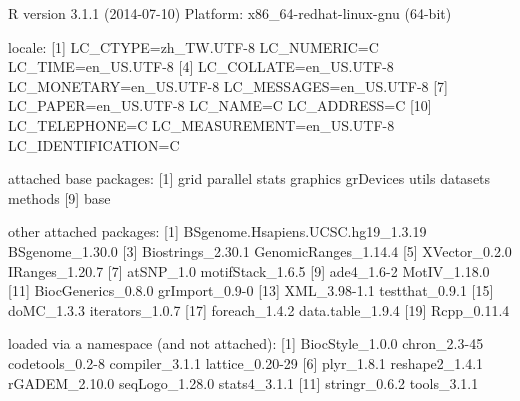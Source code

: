 \documentclass[a4paper,10pt]{article}
\begin{document}
\begin{Schunk}
\begin{Soutput}
R version 3.1.1 (2014-07-10)
Platform: x86_64-redhat-linux-gnu (64-bit)

locale:
 [1] LC_CTYPE=zh_TW.UTF-8       LC_NUMERIC=C               LC_TIME=en_US.UTF-8       
 [4] LC_COLLATE=en_US.UTF-8     LC_MONETARY=en_US.UTF-8    LC_MESSAGES=en_US.UTF-8   
 [7] LC_PAPER=en_US.UTF-8       LC_NAME=C                  LC_ADDRESS=C              
[10] LC_TELEPHONE=C             LC_MEASUREMENT=en_US.UTF-8 LC_IDENTIFICATION=C       

attached base packages:
[1] grid      parallel  stats     graphics  grDevices utils     datasets  methods  
[9] base     

other attached packages:
 [1] BSgenome.Hsapiens.UCSC.hg19_1.3.19 BSgenome_1.30.0                   
 [3] Biostrings_2.30.1                  GenomicRanges_1.14.4              
 [5] XVector_0.2.0                      IRanges_1.20.7                    
 [7] atSNP_1.0                          motifStack_1.6.5                  
 [9] ade4_1.6-2                         MotIV_1.18.0                      
[11] BiocGenerics_0.8.0                 grImport_0.9-0                    
[13] XML_3.98-1.1                       testthat_0.9.1                    
[15] doMC_1.3.3                         iterators_1.0.7                   
[17] foreach_1.4.2                      data.table_1.9.4                  
[19] Rcpp_0.11.4                       

loaded via a namespace (and not attached):
 [1] BiocStyle_1.0.0 chron_2.3-45    codetools_0.2-8 compiler_3.1.1  lattice_0.20-29
 [6] plyr_1.8.1      reshape2_1.4.1  rGADEM_2.10.0   seqLogo_1.28.0  stats4_3.1.1   
[11] stringr_0.6.2   tools_3.1.1    
\end{Soutput}
\end{Schunk}


%


\end{document}
